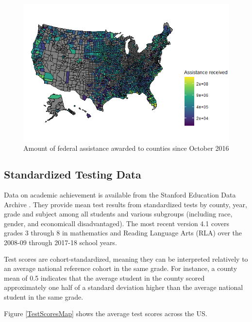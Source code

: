 \begin{figure}[!h]
	\centering
	\includegraphics[scale=0.7]{"../Code & Data/AssistanceMap.png"}
	\caption{Amount of federal assistance awarded to counties since October 2016}
	\label{AssistanceMap}
\end{figure}




\subsection{Standardized Testing Data}

Data on academic achievement is available from the Stanford Education Data Archive \citep{SEDA}. They provide mean test results from standardized tests by county, year, grade and subject among all students and various subgroups (including race, gender, and economicall disadvantaged). The most recent version 4.1 covers grades 3 through 8 in mathematics and Reading Language Arts (RLA) over the 2008-09 through 2017-18 school years.

Test scores are cohort-standardized, meaning they can be interpreted relatively to an average national reference cohort in the same grade. For instance, a county mean of 0.5 indicates that the average student in the county scored approximately one half of a standard deviation higher than the average national student in the same grade.

Figure \ref{TestScoresMap} shows the average test scores across the US.


